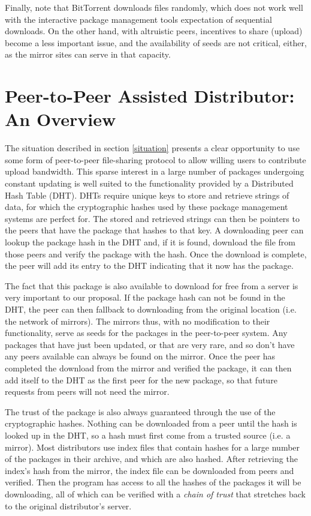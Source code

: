 \documentclass[conference]{IEEEtran}
\begin{document}
Finally, note that BitTorrent downloads files
randomly, which does not work well with the interactive package
management tools expectation of sequential downloads. On the other hand, with altruistic peers, incentives to share (upload) 
become a less important issue, and the availability of seeds are not critical, either, as the mirror sites 
can serve in that capacity.




\section{Peer-to-Peer Assisted Distributor: An Overview}
\label{opportunity}

The situation described in section \ref{situation} presents a clear
opportunity to use some form of peer-to-peer file-sharing protocol
to allow willing users to contribute upload bandwidth. This sparse
interest in a large number of packages undergoing constant updating
is well suited to the functionality provided by a Distributed Hash
Table (DHT). DHTs require unique keys to store and retrieve strings
of data, for which the cryptographic hashes used by these package
management systems are perfect for. The stored and retrieved strings
can then be pointers to the peers that have the package that hashes
to that key. A downloading peer can lookup the package hash in the
DHT and, if it is found, download the file from those peers and
verify the package with the hash. Once the download is complete, the
peer will add its entry to the DHT indicating that it now has the
package.

The fact that this package is also available to download for free
from a server is very important to our proposal. If the package hash
can not be found in the DHT, the peer can then fallback to
downloading from the original location (i.e. the network of
mirrors). The mirrors thus, with no modification to their
functionality, serve as seeds for the packages in the peer-to-peer
system. Any packages that have just been updated, or that are very
rare, and so don't have any peers available can always be found on
the mirror. Once the peer has completed the download from the mirror
and verified the package, it can then add itself to the DHT as the
first peer for the new package, so that future requests from peers
will not need the mirror.

The trust of the package is also always guaranteed through the use
of the cryptographic hashes. Nothing can be downloaded from a peer
until the hash is looked up in the DHT, so a hash must first come
from a trusted source (i.e. a mirror). Most distributors use index
files that contain hashes for a large number of the packages in
their archive, and which are also hashed. After retrieving the
index's hash from the mirror, the index file can be downloaded from
peers and verified. Then the program has access to all the hashes of
the packages it will be downloading, all of which can be verified
with a \emph{chain of trust} that stretches back to the original
distributor's server.
\end{document}

